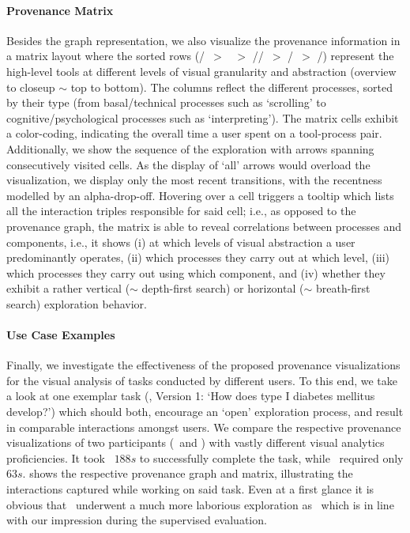 \paragraph*{Provenance Matrix}
%
Besides the graph representation, we also visualize the provenance information in a matrix layout where the sorted rows (\Startscreen/\dl\ $>$ \toc\ $>$ \wc/\hwc/\is\ $>$ \tob/\tib\ $>$ \snps/\fullt) represent the high-level tools at  different levels of visual granularity and abstraction (overview to closeup $\sim$ top to bottom). 
%
The columns reflect the different processes, sorted by their type (from basal/technical processes such as `scrolling' to cognitive/psychological processes such as `interpreting').
%
The matrix cells exhibit a color-coding, indicating the overall time a user spent on a tool-process pair.
%
Additionally, we show the sequence of the exploration with arrows spanning consecutively visited cells. 
%
As the display of `all' arrows would overload the visualization, we display only the most recent transitions, with the recentness modelled by an alpha-drop-off. 
%
Hovering over a cell triggers a tooltip which lists all the interaction triples responsible for said cell; i.e., as opposed to the provenance graph, the matrix is able to reveal correlations between processes and components, i.e., it shows 
(i) at which levels of visual abstraction a user predominantly operates, 
(ii) which processes they carry out at which level, 
(iii) which processes they carry out using which component, and 
(iv) whether they exhibit a rather vertical ($\sim$ depth-first search) or horizontal ($\sim$ breath-first search) exploration behavior.


\paragraph*{Use Case Examples}
Finally, we investigate the effectiveness of the proposed provenance visualizations for the visual analysis of tasks conducted by different users.
%
To this end, we take a look at one exemplar task (\taskWcThree, Version 1: `How does type I diabetes mellitus develop?') which should both, encourage an `open' exploration process, and result in comparable interactions amongst users. 
%
We compare the respective provenance visualizations of two participants (\POne\ and \PTwelve) with vastly different visual analytics 
proficiencies. 
%
It took \POne\ $188 \unit{s}$ to successfully complete the task, while \PTwelve\ required only $63 \unit{s}$.
%
 shows the respective provenance graph and matrix, illustrating the interactions captured while working on said task. 
%
Even at a first glance it is obvious that \POne\ underwent a much more laborious exploration as \PTwelve\ which is in line with our impression during the supervised evaluation.

